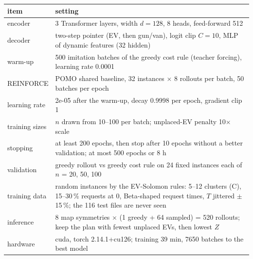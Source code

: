 \begin{tabular}{@{}lp{12.4cm}@{}}
\toprule
item & setting \\
\midrule
encoder & 3 Transformer layers, width $d=128$, 8 heads, feed-forward 512 \\
decoder & two-step pointer (EV, then gun/van), logit clip $C=10$, MLP of dynamic features (32 hidden) \\
warm-up & 500 imitation batches of the greedy cost rule (teacher forcing), learning rate 0.0001 \\
REINFORCE & POMO shared baseline, 32 instances $\times$ 8 rollouts per batch, 50 batches per epoch \\
learning rate & 2e-05 after the warm-up, decay 0.9998 per epoch, gradient clip 1 \\
training sizes & $n$ drawn from 10--100 per batch; unplaced-EV penalty 10$\times$ scale \\
stopping & at least 200 epochs, then stop after 10 epochs without a better validation; at most 500 epochs or 8 h \\
validation & greedy rollout vs greedy cost rule on 24 fixed instances each of $n$ = 20, 50, 100 \\
training data & random instances by the EV-Solomon rules: 5--12 clusters (C), 15--30\,\% requests at 0, Beta-shaped request times, $T$ jittered $\pm$15\,\%; the 116 test files are never seen \\
inference & 8 map symmetries $\times$ (1 greedy + 64 sampled) = 520 rollouts; keep the plan with fewest unplaced EVs, then lowest $Z$ \\
hardware & cuda, torch 2.14.1+cu126; training 39 min, 7650 batches to the best model \\
\bottomrule
\end{tabular}
